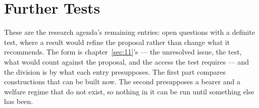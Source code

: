 \chapter{Further Tests}
\label{ch:appendix}
These are the research agenda's remaining entries: open questions with a
definite test, where a result would refine the proposal rather than change
what it recommends. The form is chapter~\ref{sec:11}'s — the unresolved
issue, the test, what would count against the proposal, and the access the
test requires — and the division is by what each entry presupposes. The
first part compares constructions that can be built now. The second
presupposes a bearer and a welfare regime that do not exist, so nothing in
it can be run until something else has been.
